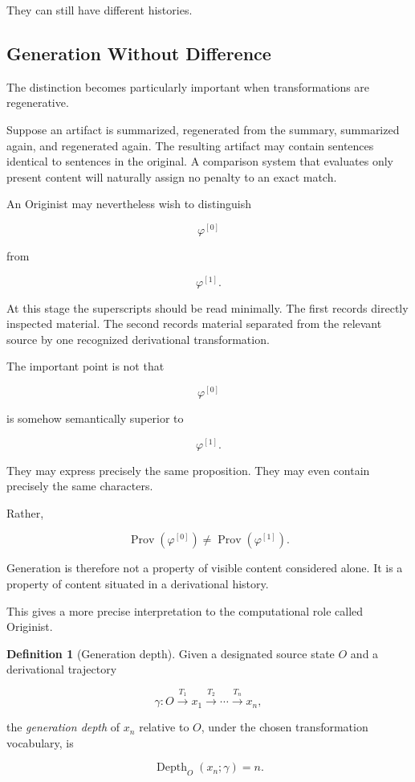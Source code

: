 \documentclass[
  11pt,
  a4paper,
  DIV=12,
  BCOR=0mm,
  parskip=half-
]{scrartcl}
\newcommand{\Prov}{\operatorname{Prov}}
\newcommand{\Depth}{\operatorname{Depth}}
\theoremstyle{definition}
\newtheorem{definition}{Definition}[section]
\theoremstyle{plain}
\theoremstyle{remark}
\begin{document}
They can still have different histories.


\subsection{Generation Without Difference}
\label{sec:generation}

The distinction becomes particularly important when transformations are
regenerative.

Suppose an artifact is summarized, regenerated from the summary, summarized
again, and regenerated again. The resulting artifact may contain sentences
identical to sentences in the original. A comparison system that evaluates
only present content will naturally assign no penalty to an exact match.

An Originist may nevertheless wish to distinguish

\[
  \varphi^{[0]}
\]

from

\[
  \varphi^{[1]}.
\]

At this stage the superscripts should be read minimally. The first records
directly inspected material. The second records material separated from the
relevant source by one recognized derivational transformation.

The important point is not that

\[
  \varphi^{[0]}
\]

is somehow semantically superior to

\[
  \varphi^{[1]}.
\]

They may express precisely the same proposition. They may even contain
precisely the same characters.

Rather,

\[
  \Prov\!\left(\varphi^{[0]}\right)
  \neq
  \Prov\!\left(\varphi^{[1]}\right).
\]

Generation is therefore not a property of visible content considered alone.
It is a property of content situated in a derivational history.

This gives a more precise interpretation to the computational role called
Originist.

\begin{definition}[Generation depth]
\label{def:generation-depth}
Given a designated source state \(O\) and a derivational trajectory

\[
  \gamma:
  O
  \xrightarrow{T_1}
  x_1
  \xrightarrow{T_2}
  \cdots
  \xrightarrow{T_n}
  x_n,
\]

the \emph{generation depth} of \(x_n\) relative to \(O\), under the chosen
transformation vocabulary, is

\[
  \Depth_O(x_n;\gamma)=n.
\]
\end{definition}
\end{document}
